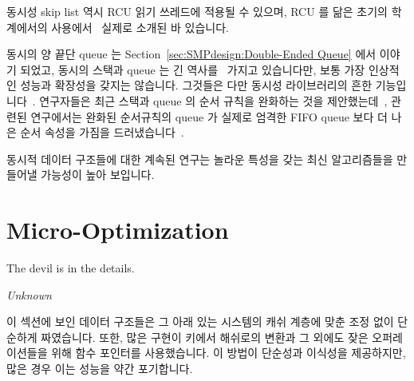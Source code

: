 \fi

동시성 skip list 역시 RCU 읽기 쓰레드에 적용될 수 있으며, RCU 를 닮은 초기의
학계에서의 사용에서~\cite{Pugh90} 실제로 소개된 바 있습니다.

동시의 양 끝단 queue 는
Section~\ref{sec:SMPdesign:Double-Ended Queue} 에서 이야기 되었고, 동시의
스택과 queue 는 긴 역사를~\cite{Treiber86} 가지고 있습니다만, 보통 가장
인상적인 성능과 확장성을 갖지는 않습니다.
그것들은 다만 동시성 라이브러리의 흔한
기능입니다~\cite{PaulMcKenney2013LWNURCUqueuestack}.
연구자들은 최근 스택과 queue 의 순서 규칙을 완화하는 것을
제안했는데~\cite{Shavit:2011:DSM:1897852.1897873}, 관련된 연구에서는 완화된
순서규칙의 queue 가 실제로 엄격한 FIFO queue 보다 더 나은 순서 속성을 가짐을
드러냈습니다~\cite{AndreasHaas2012FIFOisnt,ChristophMKirsch2012FIFOisntTR,AndreasHaas2013CFRelaxedQueues}.

동시적 데이터 구조들에 대한 계속된 연구는 놀라운 특성을 갖는 최신 알고리즘들을
만들어낼 가능성이 높아 보입니다.

\section{Micro-Optimization}
\label{sec:datastruct:Micro-Optimization}
%
\epigraph{The devil is in the details.}{\emph{Unknown}}

이 섹션에 보인 데이터 구조들은 그 아래 있는 시스템의 캐쉬 계층에 맞춘 조정 없이
단순하게 짜였습니다.
또한, 많은 구현이 키에서 해쉬로의 변환과 그 외에도 잦은 오퍼레이션들을 위해
함수 포인터를 사용했습니다.
이 방법이 단순성과 이식성을 제공하지만, 많은 경우 이는 성능을 약간 포기합니다.

